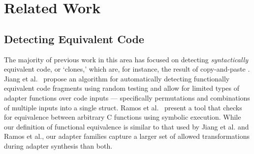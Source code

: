 \section{Related Work}\label{sec:related-work}
\subsection{Detecting Equivalent Code}
%
The majority of previous work in this area has focused on detecting \emph{syntactically} equivalent code, or `clones,' which are, for instance, the result of copy-and-paste \cite{Kamiya:2002:CMT:636188.636191,Li:2004:CTF:1251254.1251274,Jiang:2007:DSA:1248820.1248843}. 
%
%
Jiang et al.~\cite{Jiang:2009:AMF:1572272.1572283} propose an algorithm for automatically detecting functionally equivalent code fragments using random testing and allow for limited types of adapter functions over code inputs --- specifically permutations and combinations of multiple inputs into a single struct. 
Ramos et al.~\cite{Ramos:2011:PLE:2032305.2032360} present a tool that checks for equivalence between arbitrary C functions using symbolic execution.
%
While our definition of functional equivalence is similar to that used by Jiang et al. and Ramos et al., our adapter families capture a larger set of allowed transformations during adapter synthesis than both. 

